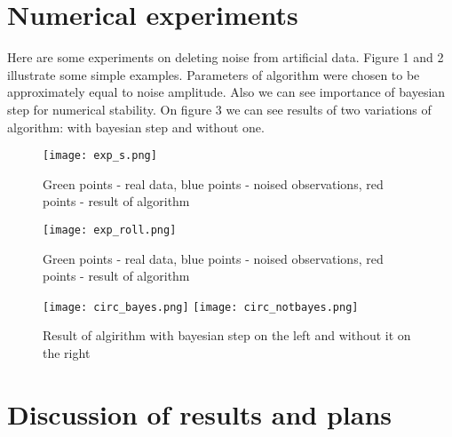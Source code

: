 \documentclass[tablecaption=bottom,wcp]{jmlr} %
\begin{document}
\section{Numerical experiments}

Here are some experiments on deleting noise from artificial data. Figure 1 and 2 illustrate some simple examples. Parameters of algorithm were chosen to be approximately equal to noise amplitude. Also we can see importance of bayesian step for numerical stability. On figure 3 we can see results of two variations of algorithm: with bayesian step and without one. 

\begin{figure}[H]
    \centering
    \texttt{[image: exp\_s.png]} 
    \caption{Green points - real data, blue points - noised observations, red points - result of algorithm}
    \label{fig:my_label}
\end{figure}

\begin{figure}[H]
    \centering
    \texttt{[image: exp\_roll.png]} 
    \caption{Green points - real data, blue points - noised observations, red points - result of algorithm}
    \label{fig:my_label}
\end{figure}



    
    
    

\begin{figure}[H]
    \centering
    {\texttt{[image: circ\_bayes.png]}}%
    \qquad
    {\texttt{[image: circ\_notbayes.png]}}%
    \caption{Result of algirithm with bayesian step on the left and without it on the right}%
    \label{fig:example}%
\end{figure}


\section{Discussion of results and plans}
\end{document}
